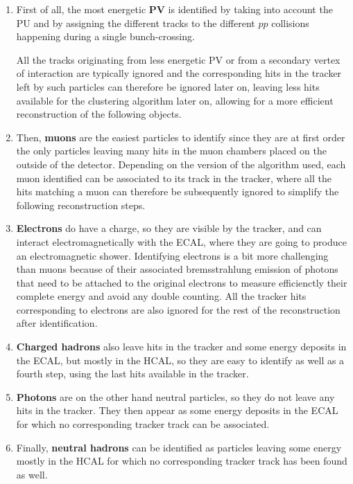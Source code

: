 \documentclass[a4paper, 10pt, openright]{report}
\begin{document}
\begin{enumerate}
\item First of all, the most energetic \textbf{\acf{PV}} is identified by taking into account the \ac{PU} and by assigning the different tracks to the different $pp$ collisions happening during a single bunch-crossing. 

All the tracks originating from less energetic \ac{PV} or from a secondary vertex of interaction are typically ignored and the corresponding hits in the tracker left by such particles can therefore be ignored later on, leaving less hits available for the clustering algorithm later on, allowing for a more efficient reconstruction of the following objects.
\item Then, \textbf{muons} are the easiest particles to identify since they are at first order the only particles leaving many hits in the muon chambers placed on the outside of the detector. Depending on the version of the algorithm used, each muon identified can be associated to its track in the tracker, where all the hits matching a muon can therefore be subsequently ignored to simplify the following reconstruction steps.
\item \textbf{Electrons} do have a charge, so they are visible by the tracker, and can interact electromagnetically with the \ac{ECAL}, where they are going to produce an electromagnetic shower. Identifying electrons is a bit more challenging than muons because of their associated bremsstrahlung emission of photons that need to be attached to the original electrons to measure efficienctly their complete energy and avoid any double counting. All the tracker hits corresponding to electrons are also ignored for the rest of the reconstruction after identification.
\item \textbf{Charged hadrons} also leave hits in the tracker and some energy deposits in the \ac{ECAL}, but mostly in the \ac{HCAL}, so they are easy to identify as well as a fourth step, using the last hits available in the tracker.
\item \textbf{Photons} are on the other hand neutral particles, so they do not leave any hits in the tracker. They then appear as some energy deposits in the \ac{ECAL} for which no corresponding tracker track can be associated.
\item Finally, \textbf{neutral hadrons} can be identified as particles leaving some energy mostly in the \ac{HCAL} for which no corresponding tracker track has been found as well.
\end{enumerate}
\end{document}
